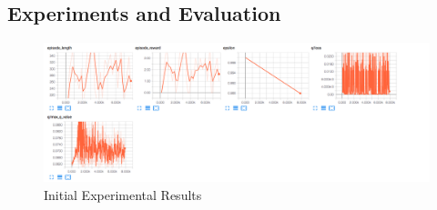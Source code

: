 \subsection{Experiments and Evaluation}

\begin{figure}%
\centering
\includegraphics[width=0.6\columnwidth]{figures/tensorboard.png}%
\caption{Initial Experimental Results}%
\label{fig:datastats}%
\end{figure}



